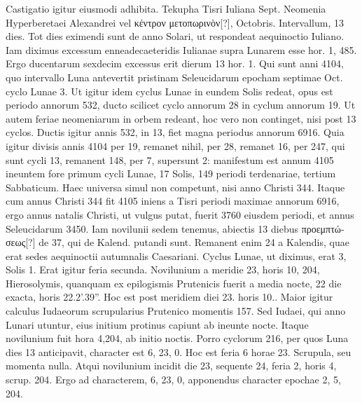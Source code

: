Castigatio igitur eiusmodi adhibita.
Tekupha Tisri Iuliana 
Sept. %
Neomenia Hyperberetaei Alexandrei vel \textgreek{κέντρον μετοπωρινὸν[?]},
 Octobris.
Intervallum, 13 dies.
Tot dies eximendi sunt de anno
Solari, ut respondeat aequinoctio Iuliano.
Iam diximus excessum
enneadecaeteridis Iulianae supra Lunarem esse hor. 1, 485. %
Ergo ducentarum
sexdecim excessus erit dierum 13 hor. 1. %
Qui sunt anni
4104, quo intervallo Luna antevertit pristinam Seleucidarum epocham
septimae Oct. cyclo Lunae 3. %
Ut igitur idem cyclus Lunae in
eundem Solis redeat, opus est periodo annorum 532, ducto scilicet
cyclo annorum 28 in cyclum annorum 19.
Ut autem feriae neomeniarum
in orbem redeant, hoc vero non continget, nisi post 13 cyclos.
Ductis igitur annis 532, in 13, fiet magna periodus annorum 6916.
Quia igitur divisis annis 4104 per 19, remanet nihil, per 28, remanet
16, per 247, qui sunt cycli 13, remanent 148, per 7, supersunt 2: manifestum
est annum 4105 ineuntem fore primum cycli Lunae, 17 Solis,
149 periodi terdenariae, tertium Sabbaticum.
Haec universa simul
non competunt, nisi anno Christi 344.
Itaque cum annus Christi
344 fit 4105 iniens a Tisri periodi maximae annorum 6916, ergo
annus natalis Christi, ut vulgus putat, fuerit 3760 eiusdem periodi,
et annus Seleucidarum 3450.
Iam novilunii sedem tenemus,
abiectis 13 diebus \textgreek{προεμπτώσεως[?]} de 37,
 qui de Kalend. putandi %
sunt.
Remanent enim 24 a Kalendis, quae erat sedes aequinoctii autumnalis
Caesariani.
Cyclus Lunae, ut diximus, erat 3, Solis 1.
Erat
igitur feria secunda.
Novilunium a meridie 23, horis 10, 204,
Hierosolymis, quanquam ex epilogismis Prutenicis fuerit a media
nocte, 22 die exacta, horis 22.2'.39''.
%
Hoc est post meridiem
diei 23. horis 10..
Maior igitur calculus Iudaeorum scrupularius
Prutenico momentis 157.
Sed Iudaei, qui anno Lunari utuntur, eius
initium protinus capiunt ab ineunte nocte.
Itaque novilunium fuit hora
4,204, ab initio noctis.
Porro cyclorum 216, per quos Luna dies 13
anticipavit, character est 6, 23, 0.
Hoc est feria 6 horae 23.
Scrupula, seu
momenta nulla.
Atqui novilunium incidit die 23, sequente 24, feria
2, horis 4, scrup. 204. %
Ergo ad characterem, 6, 23, 0, apponendus character
epochae 2, 5, 204.
